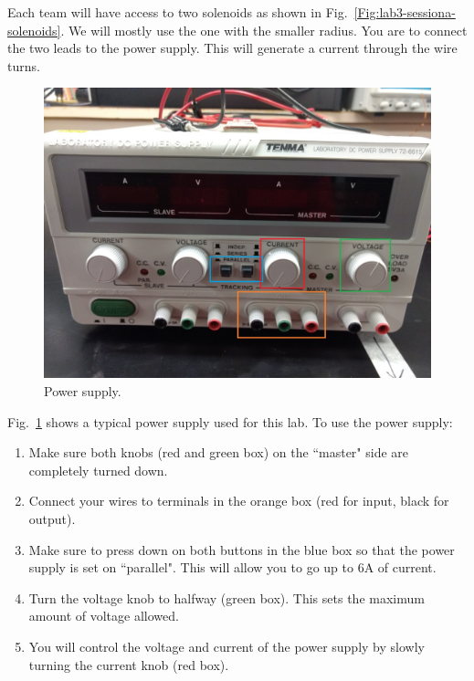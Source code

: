 \documentclass[12pt]{report}
\begin{document}
Each team will have access to two solenoids as shown in Fig.~\ref{Fig:lab3-sessiona-solenoids}. We will mostly use the one with the smaller radius. You are to connect the two leads to the power supply. This will generate a current through the wire turns.

\begin{figure}[h]
\centering
\includegraphics[scale=0.4]{lab3-power-supply}
\caption{Power supply.}
\label{Fig:lab3-power-supply}
\end{figure}
Fig.~\ref{Fig:lab3-power-supply} shows a typical power supply used for this lab. To use the power supply:
\begin{enumerate}
\item Make sure both knobs (red and green box) on the ``master" side are completely turned down.
\item Connect your wires to terminals in the orange box (red for input, black for output).
\item Make sure to press down on both buttons in the blue box so that the power supply is set on ``parallel". This will allow you to go up to 6A of current.
\item Turn the voltage knob to halfway (green box). This sets the maximum amount of voltage allowed.
\item You will control the voltage and current of the power supply by slowly turning the current knob (red box).\\
\end{enumerate}
\end{document}
